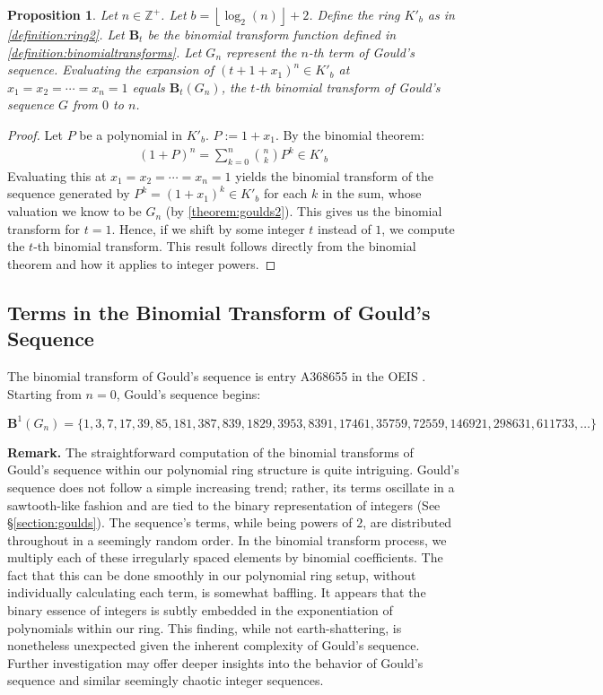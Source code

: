 \documentclass{article}
\theoremstyle{plain}
\theoremstyle{definition}
\newtheorem{proposition}{Proposition}
\newcommand{\floor}[1]{\left\lfloor #1 \right\rfloor}
\newcommand{\Z}{\mathbb{Z}}
\newcommand{\K}{K}
\newcommand{\BT}{\textbf{B}}
\begin{document}
\begin{proposition} \label{proposition:gouldbinomialtransforms}
\textit{
Let $n \in \Z^+$. Let $b={\floor{\log_2(n)}+2}$. Define the ring $\K'_b$ as in \cref{definition:ring2}. Let $\BT_t$ be the binomial transform function defined in \cref{definition:binomialtransforms}. Let $G_n$ represent the $n$-th term of Gould's sequence. Evaluating the expansion of $(t + 1 + x_1)^n \in \K'_b$ at $x_1=x_2=\cdots=x_n=1$ equals $\BT_t(G_n)$, the $t$-th binomial transform of Gould's sequence $G$ from $0$ to $n$.
}
\end{proposition}
\begin{proof}
Let $P$ be a polynomial in $\K'_b$. $P := 1 + x_1$. By the binomial theorem:
\begin{align*}
    (1 + P)^n = \sum_{k=0}^{n} \binom{n}{k} P^k \in \K'_b
\end{align*}
Evaluating this at $x_1=x_2=\cdots=x_n=1$ yields the binomial transform of the sequence generated by $P^k = (1 + x_1)^k \in \K'_b$ for each $k$ in the sum, whose valuation we know to be $G_n$ (by \cref{theorem:goulds2}). This gives us the binomial transform for $t=1$. Hence, if we shift by some integer $t$ instead of $1$, we compute the $t$-th binomial transform. This result follows directly from the binomial theorem and how it applies to integer powers.
\end{proof}

\subsection{Terms in the Binomial Transform of Gould's Sequence}
The binomial transform of Gould's sequence is entry A368655 in the OEIS \cite{A368655}. Starting from $n=0$, Gould's sequence begins:

$\BT^{1}(G_n) = \{ 1, 3, 7, 17, 39, 85, 181, 387, 839, 1829, 3953, 8391, 17461, 35759, 72559, 146921, 298631, 611733, \ldots \}$

\textbf{Remark.}
The straightforward computation of the binomial transforms of Gould's sequence within our polynomial ring structure is quite intriguing. Gould's sequence does not follow a simple increasing trend; rather, its terms oscillate in a sawtooth-like fashion and are tied to the binary representation of integers (See \S\ref{section:goulds}). The sequence's terms, while being powers of $2$, are distributed throughout in a seemingly random order. In the binomial transform process, we multiply each of these irregularly spaced elements by binomial coefficients. The fact that this can be done smoothly in our polynomial ring setup, without individually calculating each term, is somewhat baffling. It appears that the binary essence of integers is subtly embedded in the exponentiation of polynomials within our ring. This finding, while not earth-shattering, is nonetheless unexpected given the inherent complexity of Gould's sequence. Further investigation may offer deeper insights into the behavior of Gould's sequence and similar seemingly chaotic integer sequences.

\begingroup
\raggedright


\endgroup
\end{document}
